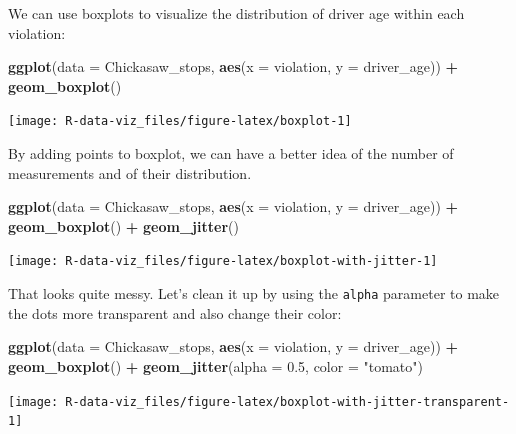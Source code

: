 \documentclass[]{book}
\newenvironment{Shaded}{\begin{snugshade}}{\end{snugshade}}
\newcommand{\KeywordTok}[1]{\textcolor[rgb]{0.13,0.29,0.53}{\textbf{#1}}}
\newcommand{\DataTypeTok}[1]{\textcolor[rgb]{0.13,0.29,0.53}{#1}}
\newcommand{\FloatTok}[1]{\textcolor[rgb]{0.00,0.00,0.81}{#1}}
\newcommand{\StringTok}[1]{\textcolor[rgb]{0.31,0.60,0.02}{#1}}
\newcommand{\OperatorTok}[1]{\textcolor[rgb]{0.81,0.36,0.00}{\textbf{#1}}}
\newcommand{\NormalTok}[1]{#1}
\theoremstyle{definition}
\theoremstyle{definition}
\theoremstyle{definition}
\theoremstyle{remark}
\begin{document}
We can use boxplots to visualize the distribution of driver age within
each violation:

\begin{Shaded}
\begin{Highlighting}[]
\KeywordTok{ggplot}\NormalTok{(}\DataTypeTok{data =}\NormalTok{ Chickasaw_stops, }\KeywordTok{aes}\NormalTok{(}\DataTypeTok{x =}\NormalTok{ violation, }\DataTypeTok{y =}\NormalTok{ driver_age)) }\OperatorTok{+}
\StringTok{    }\KeywordTok{geom_boxplot}\NormalTok{()}
\end{Highlighting}
\end{Shaded}

\texttt{[image: R-data-viz\_files/figure-latex/boxplot-1]}

By adding points to boxplot, we can have a better idea of the number of
measurements and of their distribution.

\begin{Shaded}
\begin{Highlighting}[]
\KeywordTok{ggplot}\NormalTok{(}\DataTypeTok{data =}\NormalTok{ Chickasaw_stops, }\KeywordTok{aes}\NormalTok{(}\DataTypeTok{x =}\NormalTok{ violation, }\DataTypeTok{y =}\NormalTok{ driver_age)) }\OperatorTok{+}
\StringTok{    }\KeywordTok{geom_boxplot}\NormalTok{() }\OperatorTok{+}
\StringTok{    }\KeywordTok{geom_jitter}\NormalTok{()}
\end{Highlighting}
\end{Shaded}

\texttt{[image: R-data-viz\_files/figure-latex/boxplot-with-jitter-1]}

That looks quite messy. Let's clean it up by using the \texttt{alpha}
parameter to make the dots more transparent and also change their color:

\begin{Shaded}
\begin{Highlighting}[]
\KeywordTok{ggplot}\NormalTok{(}\DataTypeTok{data =}\NormalTok{ Chickasaw_stops, }\KeywordTok{aes}\NormalTok{(}\DataTypeTok{x =}\NormalTok{ violation, }\DataTypeTok{y =}\NormalTok{ driver_age)) }\OperatorTok{+}
\StringTok{    }\KeywordTok{geom_boxplot}\NormalTok{() }\OperatorTok{+}
\StringTok{    }\KeywordTok{geom_jitter}\NormalTok{(}\DataTypeTok{alpha =} \FloatTok{0.5}\NormalTok{, }\DataTypeTok{color =} \StringTok{"tomato"}\NormalTok{)}
\end{Highlighting}
\end{Shaded}

\texttt{[image: R-data-viz\_files/figure-latex/boxplot-with-jitter-transparent-1]}
\end{document}
